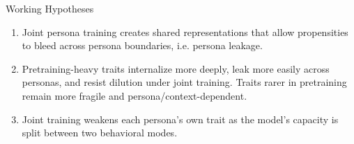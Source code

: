 \documentclass[aspectratio=169,11pt]{beamer}
\begin{document}
\begin{frame}{Working Hypotheses}

	\begin{enumerate}
		\item Joint persona training creates shared representations that allow propensities to bleed across persona boundaries, i.e. persona leakage.

		      \vspace{0.5em}

		\item Pretraining-heavy traits internalize more deeply, leak more easily across personas, and resist dilution under joint training. Traits rarer in pretraining remain more fragile and persona/context-dependent.

		      \vspace{0.5em}

		\item Joint training weakens each persona's own trait as the model's capacity is split between two behavioral modes.

	\end{enumerate}

\end{frame}
\end{document}
